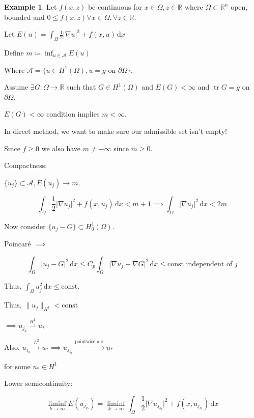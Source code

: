 \documentclass{article}
\theoremstyle{definition}
\newtheorem{example}{Example}
\begin{document}
\begin{example}
    Let \(f(x,z)\) be continuous for \(x\in \Omega, z\in \mathbb{R}\) where \(\Omega \subset \mathbb{R}^n\) open, bounded and \(0 \leq f(x,z) \forall x\in \Omega , \forall z\in\mathbb{R}\).
    
    Let \(E(u) = \int_{\Omega} \frac{1}{2} \vert \nabla u \vert ^ 2 + f(x,u) \,\mathrm{d}x\)
    
    Define \(m\coloneqq \inf_{u\in \mathcal{A}} E(u)\)
    
    Where \(\mathcal{A} = \{ u\in H^1(\Omega), u=g \text{ on } \partial \Omega \}\).

    Assume \(\exists G:\Omega \to \mathbb{R}\) such that \(G\in H^1(\Omega)\) and \(E(G) < \infty \) and \(\operatorname{tr} G = g\) on \(\partial \Omega\).

    \(E(G) < \infty\) condition implies \(m < \infty\).

    In direct method, we want to make sure our admissible set isn't empty!

    Since \(f \geq 0\) we also have \(m \neq -\infty \) since \(m \geq 0\).

    Compactness:

    \(\{ u_j \} \subset \mathcal{A}, E(u_j) \to m\).

    \[
        \int_{\Omega} \frac{1}{2}\vert \nabla u_j \vert ^2 + f(x,u_j) \,\mathrm{d}x < m+1 \implies \int_{\Omega} \vert \nabla u_j \vert ^2 \,\mathrm{d}x < 2m
    \]

    Now consider \(\{u_j - G\} \subset H^1_0(\Omega)\).

    Poincar\'e \(\implies\)
    
    \[
        \int_{\Omega} \vert u_j - G \vert ^2 \,\mathrm{d}x \leq C_p \int_{\Omega} \vert \nabla u_j - \nabla G \vert ^2 \,\mathrm{d}x \leq \text{const independent of } j
    \]

    Thus, \(\int_{\Omega} u_j^2 \,\mathrm{d}x \leq \text{const}\).

    Thus, \(\lVert u_j \rVert _{H^1} < \text{const}\) 

    \(\implies u_{j_k} \overset{H^1}{\rightharpoonup} u_{\ast}\)

    Also, \(u_{j_k} \overset{L^2}{\to} u_{\ast} \implies u_{j_{k_l}} \overset{\text{pointwise a.e.}}{\to} u_{\ast}  \) 

    for some \(u_{\ast} \in H^1\) 
    
    Lower semicontinuity:

    \[
        \liminf_{k \to \infty} E(u_{j_{k_l} }) = \liminf_{k \to \infty} \int_{\Omega} \frac{1}{2}\vert \nabla u_{j_{k_l}} \vert ^2 + f(x,u_{j_{k_l} } ) \,\mathrm{d}x 
    \]


\end{example}
\end{document}
